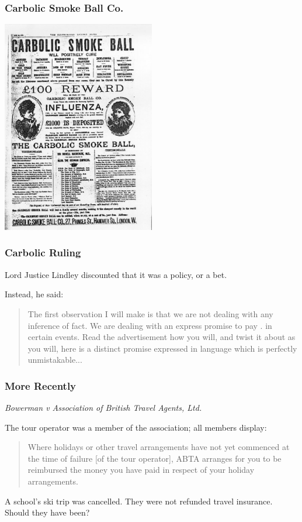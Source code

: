 \begin{frame}
\frametitle{Carbolic Smoke Ball Co.}

\begin{center}
	\includegraphics[width=0.5\textwidth]{images/carbolic.png}
\end{center}

\end{frame}



\begin{frame}
\frametitle{Carbolic Ruling}

Lord Justice Lindley discounted that it was a policy, or a bet.

Instead, he said:

\begin{quote}
The first observation I will make is that we are not dealing with any inference of fact. We are dealing with an express promise to pay . in certain events. Read the advertisement how you will, and twist it about as you will, here is a distinct promise expressed in language which is perfectly unmistakable...
\end{quote}

\end{frame}



\begin{frame}
\frametitle{More Recently}

\textit{Bowerman v Association of British Travel Agents, Ltd.}

The tour operator was a member of the association; all members display:

\begin{quote}
	Where holidays or other travel arrangements have not yet commenced at the time of failure [of the tour operator], ABTA arranges for you to be reimbursed the money you have paid in respect of your holiday arrangements. 
\end{quote}

A school's ski trip was cancelled. They were not refunded travel insurance.\\
\quad Should they have been?

\end{frame}



